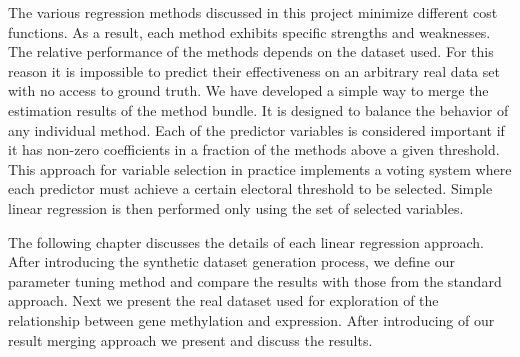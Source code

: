 The various regression methods discussed in this project minimize different cost functions. As a result, each method exhibits specific strengths and weaknesses. The relative performance of the methods depends on the dataset used. For this reason it is impossible to predict their effectiveness on an arbitrary real data set with no access to ground truth. We have developed a simple way to merge the estimation results of the method bundle. It is designed to balance the behavior of any individual method. Each of the predictor variables is considered important if it has non-zero coefficients in a fraction of the methods above a given threshold. This approach for variable selection in practice implements a voting system where each predictor must achieve a certain electoral threshold to be selected. Simple linear regression is then performed only using the set of selected variables.

The following chapter discusses the details of each linear regression approach. After introducing the synthetic dataset generation process, we define our parameter tuning method and compare the results with those from the standard approach. Next we present the real dataset used for exploration of the relationship between gene methylation and expression. After introducing of our result merging approach we present and discuss the results.